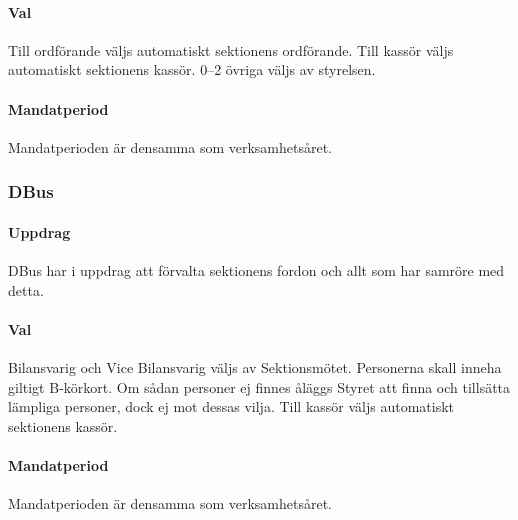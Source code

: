 \paragraph{Val}
Till ordförande väljs automatiskt sektionens ordförande. Till kassör väljs automatiskt sektionens kassör. 0--2 övriga väljs av styrelsen.

\paragraph{Mandatperiod}
Mandatperioden är densamma som verksamhetsåret.

\subsubsection{DBus}

\paragraph{Uppdrag}
DBus har i uppdrag att förvalta sektionens fordon och allt som har samröre med detta.

\paragraph{Val}
Bilansvarig och Vice Bilansvarig väljs av Sektionsmötet. Personerna skall inneha giltigt B-körkort. Om sådan personer ej finnes åläggs Styret att finna och tillsätta lämpliga personer, dock ej mot dessas vilja. Till kassör väljs automatiskt sektionens kassör.

\paragraph{Mandatperiod}
Mandatperioden är densamma som verksamhetsåret.

\newpage
